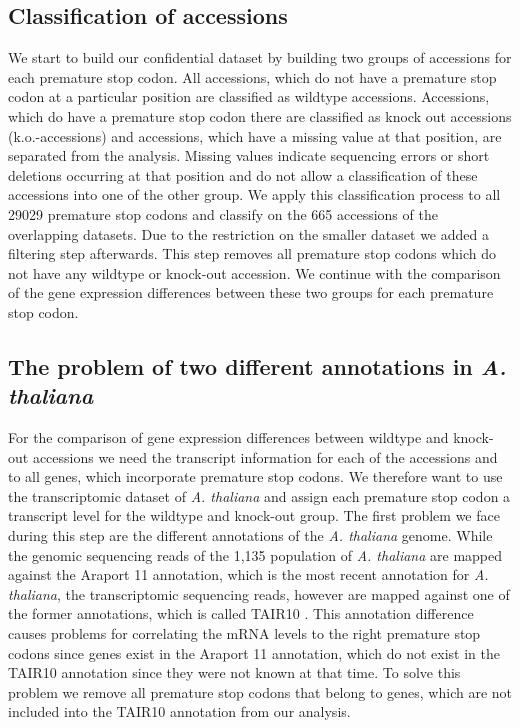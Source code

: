 \subsection*{Classification of accessions}
We start to build our confidential dataset by building two groups of accessions for each premature stop codon. All accessions, which do not have a premature stop codon at a particular position are classified as wildtype accessions. Accessions, which do have a premature stop codon there are classified as knock out accessions (k.o.-accessions) and accessions, which have a missing value at that position, are separated from the analysis. Missing values indicate sequencing errors or short deletions occurring at that position and do not allow a classification of these accessions into one of the other group. We apply this classification process to all 29029 premature stop codons and classify on the 665 accessions of the overlapping datasets. Due to the restriction on the smaller dataset we added a filtering step afterwards. This step removes all premature stop codons which do not have any wildtype or knock-out accession. We continue with the comparison of the gene expression differences between these two groups for each premature stop codon. 
\subsection*{The problem of two different annotations in \textit{A. thaliana}}
For the comparison of gene expression differences between wildtype and knock-out  accessions we need the transcript information for each of the accessions and to all genes, which incorporate premature stop codons. We therefore want to use the transcriptomic dataset of \textit{A. thaliana} and assign each premature stop codon a transcript level for the wildtype and knock-out group. 
The first problem we face during this step are the different annotations of the \textit{A. thaliana} genome. While the genomic sequencing reads of the 1,135 population of \textit{A. thaliana} are mapped against the Araport 11 \cite{Cheng2017} annotation, which is the most recent annotation for  \textit{A. thaliana}, the transcriptomic sequencing reads, however are mapped against one of the former annotations, which is called TAIR10 \cite{lamesch2012}. This annotation difference causes problems for correlating the mRNA levels to the right premature stop codons since genes exist in the Araport 11 annotation, which do not exist in the TAIR10 annotation since they were not known at that time. To solve this problem we remove all premature stop codons that belong to genes, which are not included into the TAIR10 annotation from our analysis. 
